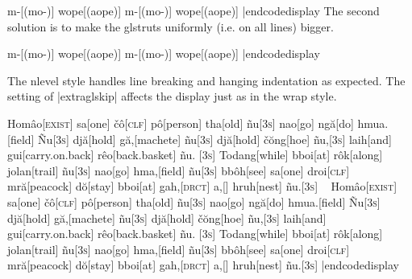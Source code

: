 \framedisplay
\ex[glstyle=nlevel,glneveryline={\it,\varstrut{4pt}}]
\begingl m-[(mo-)] wope[(a\AccentedBarredW ope)] \endgl \xe
\endframedisplay
\codedisplay
\ex[glstyle=nlevel,glneveryline={\it,\varstrut{4pt}}]
\begingl m-[(mo-)] wope[(a\AccentedBarredW ope)] \endgl \xe
|endcodedisplay
The second solution is to make the glstruts uniformly (i.e. on all
lines) bigger.

\framedisplay
\ex[glstyle=nlevel,extraglstrut=4pt 0pt]
\begingl m-[(mo-)] wope[(a\AccentedBarredW ope)] \endgl \xe
\endframedisplay
\codedisplay
\ex[glstyle=nlevel,extraglstrut=4pt 0pt]
\begingl m-[(mo-)] wope[(a\AccentedBarredW ope)] \endgl \xe
|endcodedisplay

The nlevel style handles line breaking and hanging indentation as
expected.  The setting of |extraglskip| affects the display just as in
the wrap style.

\framedisplay
\ex
\let\\=\textsc
\begingl[glstyle=nlevel,glneveryline={\it},glhangindent=1em,
   extraglskip=4pt]
Hom\^{a}o[\\{exist}]  sa[one]  \v{c}\^{o}[\\{clf}]  p\^{o}[person]
tha[old]  \~{n}u[\\{3s}]  nao[go]  ng\u{a}[do]  hmua.[field]
\~{N}u[\\{3s}]  dj\u{a}[hold]  g\u{a},[machete]  \~{n}u[\\{3s}]
dj\u{a}[hold]  \v{c}\u{o}ng[hoe]  \~{n}u,[\\{3s}]  laih[and]
gui[carry.on.back]  r\^{e}o[back.basket]  {\~{n}u. }[\\{3s}]
Todang[while] bboi[at]  r\^{o}k[along]  jolan[trail]  \~{n}u[\\{3s}]
nao[go] hma,[field]  \~{n}u[\\{3s}]  bb\^{o}h[see]  sa[one]
droi[\\{clf}] mr\u{a}[peacock]  d\u{o}[stay]  bboi[at]  gah,[\\{drct}]
a,[] hruh[nest]  \~{n}u.[\\{3s}]
\endgl \xe
\endframedisplay
\codedisplay~
\ex
\let\\=\textsc
\begingl[glstyle=nlevel,glneveryline={\it},glhangindent=1em,
   extraglskip=4pt]
Hom\^{a}o[\\{exist}]  sa[one]  \v{c}\^{o}[\\{clf}]  p\^{o}[person]
tha[old]  \~{n}u[\\{3s}]  nao[go]  ng\u{a}[do]  hmua.[field]
\~{N}u[\\{3s}]  dj\u{a}[hold]  g\u{a},[machete]  \~{n}u[\\{3s}]
dj\u{a}[hold]  \v{c}\u{o}ng[hoe]  \~{n}u,[\\{3s}]  laih[and]
gui[carry.on.back]  r\^{e}o[back.basket]  {\~{n}u. }[\\{3s}]
Todang[while] bboi[at]  r\^{o}k[along]  jolan[trail]  \~{n}u[\\{3s}]
nao[go] hma,[field]  \~{n}u[\\{3s}]  bb\^{o}h[see]  sa[one]
droi[\\{clf}] mr\u{a}[peacock]  d\u{o}[stay]  bboi[at]  gah,[\\{drct}]
a,[] hruh[nest]  \~{n}u.[\\{3s}]
\endgl \xe
|endcodedisplay

